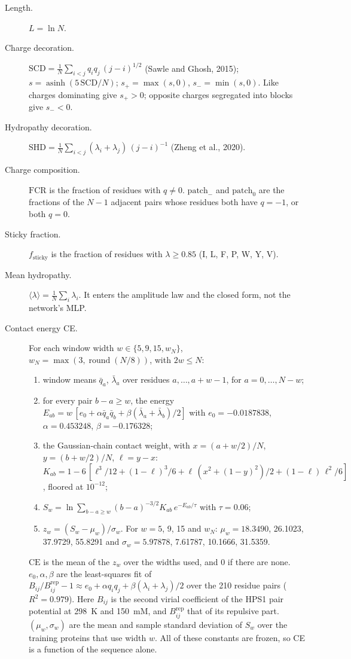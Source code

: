 \documentclass[11pt]{article}
\newcommand{\lam}{\langle\lambda\rangle}
\begin{document}
\begin{description}
\item[Length.] $L=\ln N$.
\item[Charge decoration.] $\mathrm{SCD}=\frac1N\sum_{i<j}q_iq_j\,(j-i)^{1/2}$ (Sawle and Ghosh, 2015);
  $s=\operatorname{asinh}(5\,\mathrm{SCD}/N)$; $s_+=\max(s,0)$, $s_-=\min(s,0)$. Like charges dominating give $s_+>0$;
  opposite charges segregated into blocks give $s_-<0$.
\item[Hydropathy decoration.] $\mathrm{SHD}=\frac1N\sum_{i<j}(\lambda_i+\lambda_j)\,(j-i)^{-1}$ (Zheng et al., 2020).
\item[Charge composition.] $\mathrm{FCR}$ is the fraction of residues with $q\neq0$. $\mathrm{patch}_-$ and
  $\mathrm{patch}_0$ are the fractions of the $N-1$ adjacent pairs whose residues both have $q=-1$, or both $q=0$.
\item[Sticky fraction.] $f_{\mathrm{sticky}}$ is the fraction of residues with $\lambda\ge0.85$ (I, L, F, P, W, Y, V).
\item[Mean hydropathy.] $\lam=\frac1N\sum_i\lambda_i$. It enters the amplitude law and the closed form, not the
  network's MLP.
\item[Contact energy CE.] For each window width $w\in\{5,9,15,w_N\}$, $w_N=\max(3,\operatorname{round}(N/8))$, with
  $2w\le N$:
  \begin{enumerate}
  \item window means $\bar q_a$, $\bar\lambda_a$ over residues $a,\dots,a+w-1$, for $a=0,\dots,N-w$;
  \item for every pair $b-a\ge w$, the energy $E_{ab}=w\,[e_0+\alpha\bar q_a\bar q_b+\beta(\bar\lambda_a+\bar\lambda_b)/2]$
    with $e_0=-0.0187838$, $\alpha=0.453248$, $\beta=-0.176328$;
  \item the Gaussian-chain contact weight, with $x=(a+w/2)/N$, $y=(b+w/2)/N$, $\ell=y-x$:
    $K_{ab}=1-6\,[\ell^3/12+(1-\ell)^3/6+\ell\,(x^2+(1-y)^2)/2+(1-\ell)\,\ell^2/6]$, floored at $10^{-12}$;
  \item $S_w=\ln\sum_{b-a\ge w}(b-a)^{-3/2}K_{ab}\,e^{-E_{ab}/\tau}$ with $\tau=0.06$;
  \item $z_w=(S_w-\mu_w)/\sigma_w$. For $w=5$, 9, 15 and $w_N$: $\mu_w=18.3490$, 26.1023, 37.9729, 55.8291 and
    $\sigma_w=5.97878$, 7.61787, 10.1666, 31.5359.
  \end{enumerate}
  $\mathrm{CE}$ is the mean of the $z_w$ over the widths used, and 0 if there are none. $e_0,\alpha,\beta$ are the
  least-squares fit of $B_{ij}/B^{\mathrm{rep}}_{ij}-1\approx e_0+\alpha q_iq_j+\beta(\lambda_i+\lambda_j)/2$ over the 210 residue pairs ($R^2=0.979$). Here $B_{ij}$ is the
  second virial coefficient of the HPS1 pair potential at 298~K and 150~mM, and $B^{\mathrm{rep}}_{ij}$ that of its
  repulsive part. $(\mu_w,\sigma_w)$ are the mean and sample standard deviation of $S_w$ over the training proteins
  that use width $w$. All of these constants are frozen, so CE is a function of the sequence alone.
\end{description}
\end{document}
